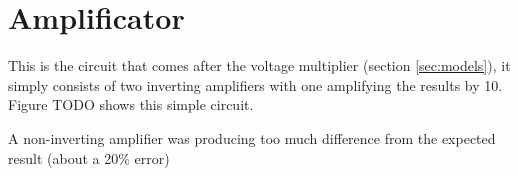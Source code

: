 \label{ap:a}

\section{Amplificator}\label{apsec:amp}

This is the circuit that comes after the voltage multiplier (section \ref{sec:models}), it simply consists of two inverting amplifiers with one amplifying the results by 10. Figure TODO shows this simple circuit.

A non-inverting amplifier was producing too much difference from the expected result (about a 20\% error) %
